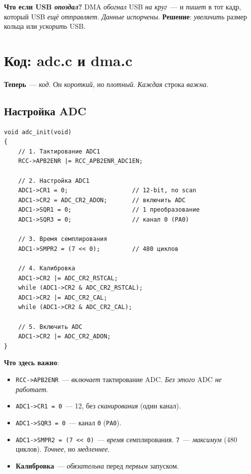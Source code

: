 \begin{warnbox}
\textbf{Что если USB \emph{опоздал}?} DMA \emph{обогнал}
USB \emph{на круг}~--- и \emph{пишет} в тот кадр,
который USB \emph{ещё} \emph{отправляет}. \emph{Данные}
\emph{испорчены}. \textbf{Решение}: \emph{увеличить}
размер кольца или \emph{ускорить} USB.
\end{warnbox}

\section{Код: adc.c и dma.c}
\label{sec:adc-code}

\textbf{Теперь}~--- \emph{код}. Он \emph{короткий}, но
\emph{плотный}. \emph{Каждая} строка \emph{важна}.

\subsection{Настройка ADC}

\begin{listing}[htbp]
\begin{verbatim}
void adc_init(void)
{
    // 1. Тактирование ADC1
    RCC->APB2ENR |= RCC_APB2ENR_ADC1EN;

    // 2. Настройка ADC1
    ADC1->CR1 = 0;                  // 12-bit, no scan
    ADC1->CR2 = ADC_CR2_ADON;       // включить ADC
    ADC1->SQR1 = 0;                 // 1 преобразование
    ADC1->SQR3 = 0;                 // канал 0 (PA0)

    // 3. Время семплирования
    ADC1->SMPR2 = (7 << 0);         // 480 циклов

    // 4. Калибровка
    ADC1->CR2 |= ADC_CR2_RSTCAL;
    while (ADC1->CR2 & ADC_CR2_RSTCAL);
    ADC1->CR2 |= ADC_CR2_CAL;
    while (ADC1->CR2 & ADC_CR2_CAL);

    // 5. Включить ADC
    ADC1->CR2 |= ADC_CR2_ADON;
}
\end{verbatim}
\caption{\texttt{adc\_init()}~--- настройка ADC1}
\label{lst:adc-init}
\end{listing}

\textbf{Что здесь важно}:
\begin{itemize}
    \item \texttt{RCC->APB2ENR}~--- \emph{включает} тактирование
          ADC. \emph{Без этого} ADC \emph{не работает}.
    \item \texttt{ADC1->CR1 = 0}~--- \SI{12}{\bit}, без
          \emph{сканирования} (один канал).
    \item \texttt{ADC1->SQR3 = 0}~--- канал \texttt{0}
          (\texttt{PA0}).
    \item \texttt{ADC1->SMPR2 = (7 << 0)}~--- \emph{время}
          семплирования. \texttt{7}~--- \emph{максимум} (\num{480}
          циклов). \emph{Точнее}, но \emph{медленнее}.
    \item \textbf{Калибровка}~--- \emph{обязательна} перед
          \emph{первым} запуском.
\end{itemize}


